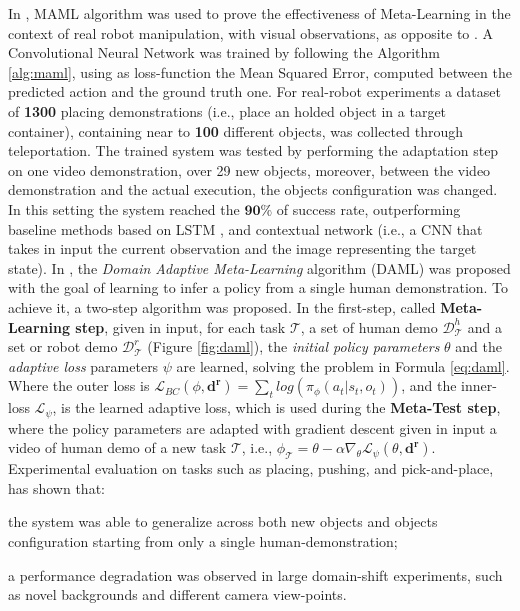 \newline In \cite{finn2017one_shot_visual_il}, MAML algorithm was used to prove the effectiveness of Meta-Learning in the context of real robot manipulation, with visual observations, as opposite to \cite{duan2017one_shot_il}. A Convolutional Neural Network was trained by following the Algorithm \ref{alg:maml}, using as loss-function the Mean Squared Error, computed between the predicted action and the ground truth one. For real-robot experiments a dataset of \textbf{1300} placing demonstrations (i.e., place an holded object in a target container), containing near to \textbf{100} different objects, was collected through teleportation. The trained system was tested by performing the adaptation step on one video demonstration, over 29 new objects, moreover, between the video demonstration and the actual execution, the objects configuration was changed. In this setting the system reached the $\mathbf{90\%}$ of success rate, outperforming baseline methods based on LSTM \cite{duan2017one_shot_il}, and contextual network (i.e., a CNN that takes in input the current observation and the image representing the target state). 
In \cite{yu2018daml}, the \textit{Domain Adaptive Meta-Learning} algorithm (DAML) was proposed with the goal of learning to infer a policy from a single human demonstration. To achieve it, a two-step algorithm was proposed. In the first-step, called \textbf{Meta-Learning step}, given in input, for each task $\mathcal{T}$, a set of human demo $\mathcal{D}^{h}_{\mathcal{T}}$ and a set or robot demo $\mathcal{D}^{r}_{\mathcal{T}}$ (Figure \ref{fig:daml}), the \textit{initial policy parameters} $\theta$ and the \textit{adaptive loss} parameters $\psi$ are learned, solving the problem in Formula \ref{eq:daml}. 
\newline Where the outer loss is $\mathcal{L}_{BC}(\phi,\mathbf{d^{r}}) = \sum_{t} log(\pi_{\phi}(a_{t}|s_{t},o_{t}))$, and the inner-loss $\mathcal{L}_{\psi}$, is the learned adaptive loss, which is used during the \textbf{Meta-Test step}, where the policy parameters are adapted with gradient descent given in input a video of human demo of a new task $\mathcal{T}$, i.e., $\phi_{\mathcal{T}} = \theta - \alpha \nabla_{\theta} \mathcal{L}_{\psi}(\theta, \mathbf{d^{r}})$. Experimental evaluation on tasks such as placing, pushing, and pick-and-place, has shown that: \begin{enumerate*}[label=\textbf{(\alph*)}]
    \item the system was able to generalize across both new objects and objects configuration starting from only a single human-demonstration;
    \item a performance degradation was observed in large domain-shift experiments, such as novel backgrounds and different camera view-points.
\end{enumerate*}

